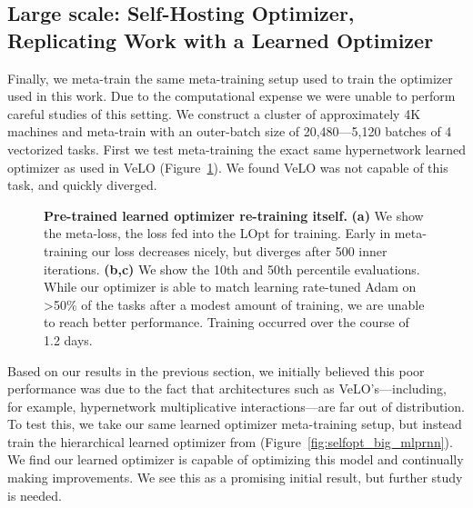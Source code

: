 \documentclass[11pt]{article}
\begin{document}
\subsection{Large scale: Self-Hosting Optimizer, Replicating Work with a Learned Optimizer}
Finally, we meta-train the same meta-training setup used to train the optimizer used in this work. Due to the computational expense we were unable to perform careful studies of this setting. We construct a cluster of approximately 4K machines and meta-train with an outer-batch size of 20,480---5,120 batches of 4 vectorized tasks. First we test meta-training the exact same hypernetwork learned optimizer as used in VeLO (Figure~\ref{fig:selfopt_big_hyperlopt}). We found VeLO was not capable of this task, and quickly diverged.
\begin{figure}[t!]
    \centering
    \caption{\textbf{Pre-trained learned optimizer re-training itself.} \textbf{(a)} We show the meta-loss, the loss fed into the LOpt for training. Early in meta-training our loss decreases nicely, but diverges after 500 inner iterations. \textbf{(b,c)} We show the 10th and 50th percentile evaluations. While our optimizer is able to match learning rate-tuned Adam on >50\% of the tasks after a modest amount of training, we are unable to reach better performance.
    Training occurred over the course of 1.2 days.
    \label{fig:selfopt_big_hyperlopt}
    }
\end{figure}

Based on our results in the previous section, we initially believed this poor performance was due to the fact that architectures such as VeLO's---including, for example, hypernetwork multiplicative interactions---are far out of distribution. 
To test this, we take our same learned optimizer meta-training setup, but instead train the hierarchical learned optimizer from \citet{metz2020tasks} (Figure~\ref{fig:selfopt_big_mlprnn}).
We find our learned optimizer is capable of optimizing this model and continually making improvements. We see this as a promising initial result, but further study is needed.
\end{document}
